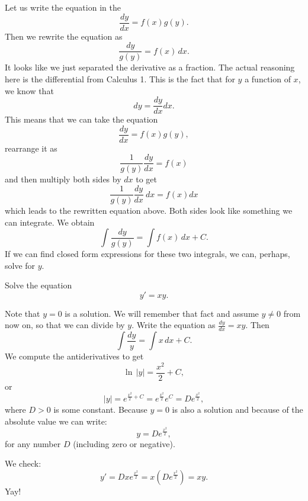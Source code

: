 Let us write the equation in the 
\begin{equation*}
\frac{dy}{dx} = f(x)g(y) .
\end{equation*}
Then we rewrite the equation as
\begin{equation*}
\frac{dy}{g(y)} = f(x) \,dx .
\end{equation*}
It looks like we just separated the derivative as a fraction. The actual reasoning here is the differential from Calculus 1. This is the fact that for $y$ a function of $x$, we know that \begin{equation*}
dy = \frac{dy}{dx} dx.
\end{equation*}
This means that we can take the equation 
\begin{equation*}
\frac{dy}{dx} = f(x)g(y),
\end{equation*}
rearrange it as 
\begin{equation*}
\frac{1}{g(y)} \frac{dy}{dx} = f(x)
\end{equation*}
and then multiply both sides by $dx$ to get 
\begin{equation*}
\frac{1}{g(y)} \frac{dy}{dx}\ dx = f(x) dx
\end{equation*} which leads to the rewritten equation above. 
Both sides look like something we can integrate.  We obtain
\begin{equation*}
\int \frac{dy}{g(y)} = \int f(x) \,dx + C .
\end{equation*}
If we can find closed form expressions
for these two integrals, we can, perhaps, solve for $y$.

\begin{example} \label{example:yprimeisxy}
Solve the equation
\begin{equation*}
y' = xy .
\end{equation*}
\end{example}
\begin{exampleSol}
Note that $y=0$ is a solution.  We will remember that fact and
assume $y \not =0$ from now on, so that we can divide by $y$.
Write the equation as $\frac{dy}{dx} = xy$. Then
\begin{equation*}
\int \frac{dy}{y} = \int x\,dx + C .
\end{equation*}
We compute the antiderivatives to get
\begin{equation*}
\ln \, \lvert y\rvert = \frac{x^2}{2} + C ,
\end{equation*}
or
\begin{equation*}
\lvert y \rvert = e^{\frac{x^2}{2} + C} = e^{\frac{x^2}{2}} e^C = D e^{\frac{x^2}{2}} ,
\end{equation*}
where $D > 0$ is some constant.  Because $y=0$ is also a solution and because
of the absolute value we can write:
\begin{equation*}
y = D e^{\frac{x^2}{2}} ,
\end{equation*}
for any number $D$ (including zero or negative).

We check:
\begin{equation*}
y' = D x e^{\frac{x^2}{2}} = x \left( D e^{\frac{x^2}{2}} \right) = xy .
\end{equation*}
Yay!
\end{exampleSol}

